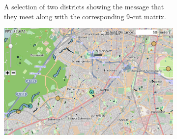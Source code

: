 \begin{figure}[t]
\begin{subfigure}[b]{0.3\textwidth}
				\caption{A selection of two districts showing the message that
				they meet along with the corresponding 9-cut matrix.}
				\label{fig:rel}
		\end{subfigure}
        \begin{subfigure}[b]{0.3\textwidth}
                \centering
                \includegraphics[width=\textwidth]{imgs/parks}
                \caption{\todo{}}
                \label{fig:parks}
        \end{subfigure}
        \caption{\todo{}}
\end{figure}
